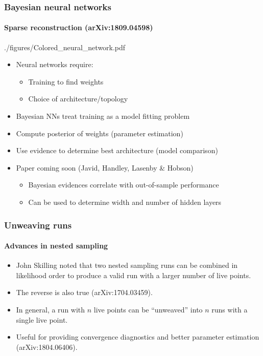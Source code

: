 \documentclass[%
]{beamer}
\begin{document}
\begin{frame}
    \frametitle{Bayesian neural networks}
    \framesubtitle{Sparse reconstruction (arXiv:1809.04598)}

    \begin{figright}[0.6]{./figures/Colored_neural_network.pdf}
        \begin{itemize}
            \item Neural networks require:
                \begin{itemize}
                    \item Training to find weights
                    \item Choice of architecture/topology
                \end{itemize}
            \item Bayesian NNs treat training as a model fitting problem
            \item Compute posterior of weights (parameter estimation)
            \item Use evidence to determine best architecture (model comparison)
            \item Paper coming soon (Javid, Handley, Lasenby \& Hobson)
                \begin{itemize}
                    \item Bayesian evidences correlate with out-of-sample performance
                    \item Can be used to determine width and number of hidden layers
                \end{itemize}
        \end{itemize}
    \end{figright}
\end{frame}

\begin{frame}
    \frametitle{Unweaving runs}
    \framesubtitle{Advances in nested sampling}
    \begin{itemize}
        \item John Skilling noted that two nested sampling runs can be combined in likelihood order to produce a valid run with a larger number of live points.
        \item The reverse is also true (arXiv:1704.03459).
        \item In general, a run with $n$ live points can be ``unweaved'' into $n$ runs with a single live point.
        \item Useful for providing convergence diagnostics and better parameter estimation (arXiv:1804.06406).
    \end{itemize}
\end{frame}
\end{document}
